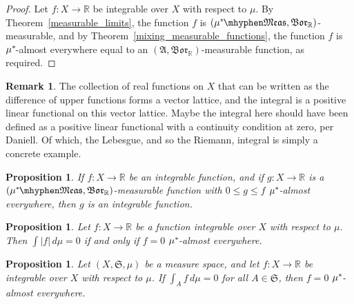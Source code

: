 \documentclass[
twoside=true,
paper=letter,
fontsize=9pt,
pagesize=auto,
leqno,
openany,
headsepline,
overfullrule,
]{scrbook}
\theoremstyle{plain}
\theoremstyle{plain}
\newtheorem{prop}[thm]{Proposition}
\theoremstyle{definition}
\newtheorem{rmk}[thm]{Remark}
\theoremstyle{bfnoteitalic}
\theoremstyle{bfnoteroman}
\newcommand{\sigalg}[1]{\mathfrak{#1}}
\newcommand{\borel}{\mathfrak{Bor}}
\newcommand{\abs}[1]{\left\vert#1\right\vert}
\newcommand{\R}{\mathbb{R}}
\newcommand{\semiring}{\sigalg{S}}
\newcommand{\sigmaalgebra}{\sigalg{A}}
\newcommand{\measurable}[1]{{#1}\mhyphen\mathfrak{Meas}}
\newcommand{\kernast}{\ast\kern-1pt}
\newcommand{\funcf}{f}
\newcommand{\function}{f}
\newcommand{\functionii}{g}
\newcommand{\measurespace}{X}
\newcommand{\measure}{\mu}
\newcommand{\measmu}{\mu}
\newcommand{\seti}{A}
\begin{document}
\begin{proof}
Let
$f:\measurespace\to\R$ be integrable over $\measurespace$ with respect to $\measure$.
By Theorem~\ref{measurable_limits},  the function $\funcf$ is
$(\measurable{\measure^\kernast}, \borel_\R)$\hyp{}measurable, and
by Theorem~\ref{mixing_measurable_functions}, the function $\funcf$ is $\measure^\kernast$\hyp{}almost everywhere equal to an $(\sigmaalgebra,\borel_\R)$\hyp{}measurable function, as required.
\end{proof}


\begin{rmk}
The collection of real functions on $\measurespace$ that can be written as the difference of upper functions forms a vector lattice, and the integral is a positive linear functional on this vector lattice. Maybe the integral here should have been defined as a positive linear functional with a continuity condition at zero, per Daniell. Of which, the Lebesgue, and so the Riemann, integral is simply a concrete example.
\end{rmk}



\begin{prop}\label{dominated_by_integrable}
If $\function:\measurespace \to \R$ be an integrable function,
and if $\functionii:\measurespace \to \R$ is a $(\measurable{\measure^\kernast},\borel_\R)$\hyp{}measurable function with
$0\leq \functionii \leq \function$ $\measure^\kernast$\hyp{}almost everywhere, then $\functionii$ is an integrable function.
\end{prop}



\begin{prop}\label{integral_absolute_zero}
Let $f:\measurespace\to\R$ be a function integrable over $\measurespace$ with respect to $\measure$.  
Then $\int \abs{f} \,d\measure = 0$ if and only if $f=0$ $\measure^\kernast$\hyp{}almost everywhere.
\end{prop}


\begin{prop}\label{uniqueness_radon_nikodym}
Let
$(\measurespace,\semiring,\measure)$
be a measure space, and let $\funcf:\measurespace\to\R$ be integrable over
$\measurespace$
with respect to $\measure$.
If
$\int_\seti f\, d\measmu = 0$ for all $\seti\in\semiring$, then
$f = 0$ $\measure^\kernast$\hyp{}almost everywhere.
\end{prop}
\end{document}

